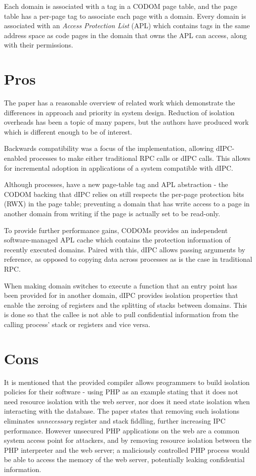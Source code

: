 \documentclass{article}
\begin{document}
Each domain is associated with a tag in a CODOM page table, and the page table has a per-page tag to associate each page with a domain. Every domain is  associated with an \textit{Access Protection List} (APL) which contains tags in the same address space as code pages in the domain that owns the APL can access, along with their permissions.

\section*{Pros}
The paper has a reasonable overview of related work which demonstrate the differences in approach and priority in system design. Reduction of isolation overheads has been a topic of many papers, but the authors have produced work which is different enough to be of interest.

Backwards compatibility was a focus of the implementation, allowing dIPC-enabled processes to make either traditional RPC calls or dIPC calls. This allows for incremental adoption in applications of a system compatible with dIPC.

Although processes, have a new page-table tag and APL abstraction - the CODOM backing that dIPC relies on still respects the per-page protection bits (RWX) in the page table; preventing a domain that has write access to a page in another domain from writing if the page is actually set to be read-only.

To provide further performance gains, CODOMs provides an independent software-managed APL cache which contains the protection information of recently executed domains. Paired with this, dIPC allows passing arguments by reference, as opposed to copying data across processes as is the case in traditional RPC.

When making domain switches to execute a function that an entry point has been provided for in another domain, dIPC provides isolation properties that enable the zeroing of registers and the splitting of stacks between domains. This is done so that the callee is not able to pull confidential information from the calling process' stack or registers and vice versa.


\section*{Cons}
It is mentioned that the provided compiler allows programmers to build isolation policies for their software - using PHP as an example stating that it does not need resource isolation with the web server, nor does it need state isolation when interacting with the database. The paper states that removing such isolations eliminates \textit{unnecessary} register and stack fiddling, further increasing IPC performance. However unsecured PHP applications on the web are a common system access point for attackers, and by removing resource isolation between the PHP interpreter and the web server; a maliciously controlled PHP process would be able to access the memory of the web server, potentially leaking confidential information.
\end{document}

